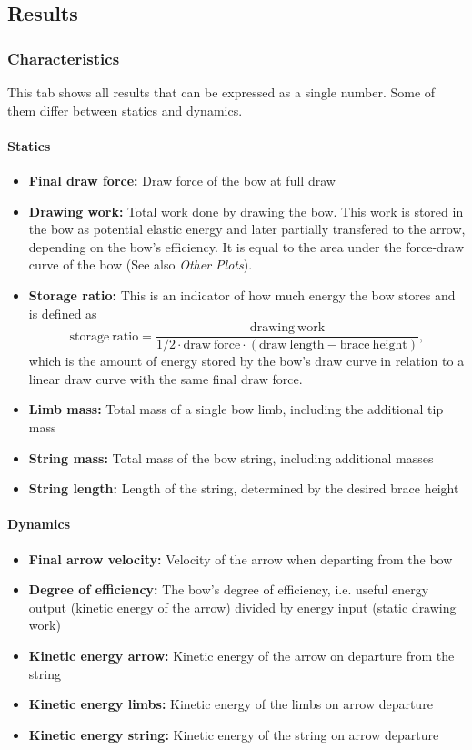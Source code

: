 \documentclass[12pt]{article}
\begin{document}
\newpage
\subsection{Results}

\subsubsection{Characteristics}

This tab shows all results that can be expressed as a single number.
Some of them differ between statics and dynamics.

\paragraph*{Statics}

\begin{itemize}
\item \textbf{Final draw force:} Draw force of the bow at full draw
\item \textbf{Drawing work:} Total work done by drawing the bow. This work is stored in the bow as potential elastic energy and later partially transfered to the arrow, depending on the bow's efficiency. It is equal to the area under the force-draw curve of the bow (See also \textit{Other Plots}).
    \item \textbf{Storage ratio:} This is an indicator of how much energy the bow stores and is defined as
$$\mathrm{storage\ ratio} = \frac{\mathrm{drawing\ work}}{1/2\cdot \mathrm{draw\ force}\cdot (\mathrm{draw\ length} - \mathrm{brace\ height})},$$
which is the amount of energy stored by the bow's draw curve in relation to a linear draw curve with the same final draw force.
\item \textbf{Limb mass:} Total mass of a single bow limb, including the additional tip mass
\item \textbf{String mass:}  Total mass of the bow string, including additional masses
\item \textbf{String length:} Length of the string, determined by the desired brace height
\end{itemize}

\paragraph*{Dynamics}

\begin{itemize}
\item \textbf{Final arrow velocity:} Velocity of the arrow when departing from the bow
\item \textbf{Degree of efficiency:} The bow's degree of efficiency, i.e. useful energy output (kinetic energy of the arrow) divided by energy input (static drawing work)
\item \textbf{Kinetic energy arrow:} Kinetic energy of the arrow on departure from the string
\item \textbf{Kinetic energy limbs:} Kinetic energy of the limbs on arrow departure
\item \textbf{Kinetic energy string:} Kinetic energy of the string on arrow departure
\end{itemize}
\end{document}
